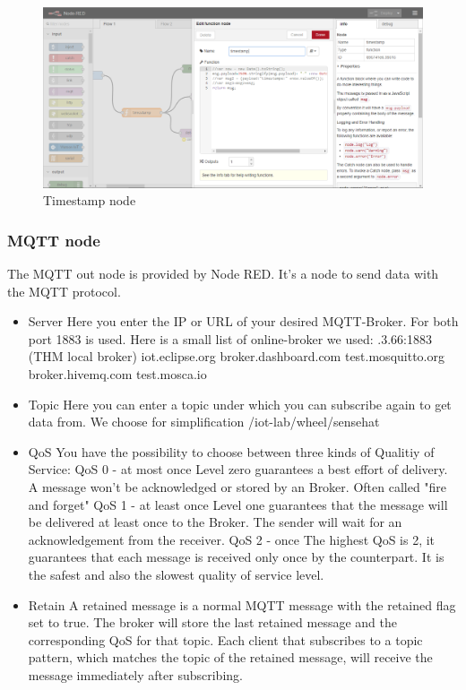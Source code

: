 \documentclass[12pt]{article}
\begin{document}
\begin{figure}[H]
	\includegraphics[width=\textwidth]{timestamp_function_node_red.PNG}
	\caption{Timestamp node}
	\label{img:timestamp_function_node_red.PNG}
\end{figure}

\subsubsection{MQTT node}
The MQTT out node is provided by Node RED. It's a node to send data with the MQTT protocol. 
	\begin{itemize}
		\item Server\newline
		Here you enter the IP or URL of your desired MQTT-Broker. For both port 1883 is used. 
		Here is a small list of online-broker we used:
		.3.66:1883 (THM local broker)
		\subitem iot.eclipse.org			
		\subitem broker.dashboard.com		
		\subitem test.mosquitto.org			
		\subitem broker.hivemq.com		
		\subitem test.mosca.io		
		\item Topic\newline
		Here you can enter a topic under which you can subscribe again to get data from. We choose for simplification /iot-lab/wheel/sensehat
		\item QoS\newline
		You have the possibility to choose between three kinds of Qualitiy of Service:
		\subitem QoS 0 - at most once
		\subitem Level zero guarantees a best effort of delivery. A message won't be 
		\subitem acknowledged or stored by an Broker. Often called "fire and forget"
		\subitem QoS 1 - at least once
		\subitem Level one guarantees that the message will be delivered at least  
		\subitem once to the Broker. The sender will wait for an acknowledgement 
		\subitem from the receiver. 
		\subitem QoS 2 - once
		\subitem The highest QoS is 2, it guarantees that each message is received 
		\subitem only once by the counterpart. It is the safest and
		\subitem  also the slowest quality of service level.
		\item Retain\newline
		A retained message is a normal MQTT message with the retained flag set to true. The broker will store the last retained message and the corresponding QoS for that topic. Each client that subscribes to a topic pattern, which matches the topic of the retained message, will receive the message immediately after subscribing.
	\end{itemize}  
\end{document}
